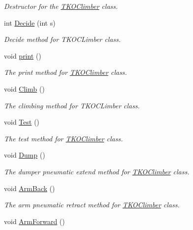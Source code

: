 \begin{DoxyCompactItemize}
\begin{DoxyCompactList}\small\item\em \-Destructor for the \hyperlink{classTKOClimber}{\-T\-K\-O\-Climber} class. \end{DoxyCompactList}\item 
int \hyperlink{classTKOClimber_a86a910c6e9cc08b308383507eee6d02b}{\-Decide} (int s)
\begin{DoxyCompactList}\small\item\em \-Decide method for \-T\-K\-O\-C\-Limber class. \end{DoxyCompactList}\item 
void \hyperlink{classTKOClimber_a288a7ae811b66832c8ef7cc8d9ff605f}{print} ()
\begin{DoxyCompactList}\small\item\em \-The print method for \hyperlink{classTKOClimber}{\-T\-K\-O\-Climber} class. \end{DoxyCompactList}\item 
void \hyperlink{classTKOClimber_a4aceaf8b04aa9652dff701ceb1b8f28d}{\-Climb} ()
\begin{DoxyCompactList}\small\item\em \-The climbing method for \-T\-K\-O\-C\-Limber class. \end{DoxyCompactList}\item 
void \hyperlink{classTKOClimber_a73c9efc5056027a3fe06bbb141587446}{\-Test} ()
\begin{DoxyCompactList}\small\item\em \-The test method for \hyperlink{classTKOClimber}{\-T\-K\-O\-Climber} class. \end{DoxyCompactList}\item 
void \hyperlink{classTKOClimber_a6633d96d31b2546b3d0d9fde0449e519}{\-Dump} ()
\begin{DoxyCompactList}\small\item\em \-The dumper pneumatic extend method for \hyperlink{classTKOClimber}{\-T\-K\-O\-Climber} class. \end{DoxyCompactList}\item 
void \hyperlink{classTKOClimber_a1bbbe509f52c39ac385830a5ce014660}{\-Arm\-Back} ()
\begin{DoxyCompactList}\small\item\em \-The arm pneumatic retract method for \hyperlink{classTKOClimber}{\-T\-K\-O\-Climber} class. \end{DoxyCompactList}\item 
void \hyperlink{classTKOClimber_a14bf7095b667d9c0aeadde0881f1e280}{\-Arm\-Forward} ()

\end{DoxyCompactItemize}
